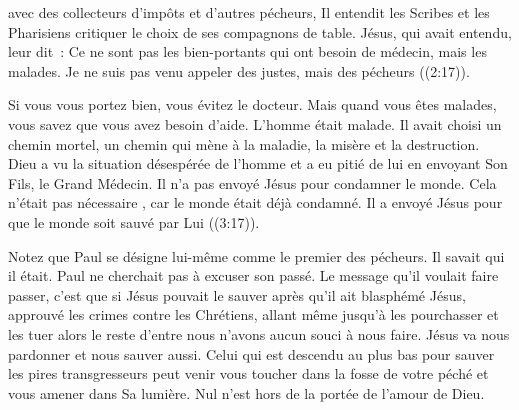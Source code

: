 



 avec des collecteurs d'impôts
 et d'autres pécheurs, Il entendit les Scribes et les Pharisiens
 critiquer le choix de ses compagnons de table.
 \og Jésus, qui avait entendu, leur dit~:
 Ce ne sont pas les bien-portants qui ont besoin de médecin,
 mais les malades. Je ne suis pas venu appeler des justes,
 mais des pécheurs \fg{} 
 ((2:17)).


Si vous vous portez bien, vous évitez le docteur.
 Mais quand vous êtes malades, vous savez que vous avez besoin d'aide.
 L'homme était malade. Il avait choisi un chemin mortel,
 un chemin qui mène à la maladie, la misère et la destruction.
 Dieu a vu la situation désespérée de l'homme et a eu pitié de lui
 en envoyant Son Fils, le Grand Médecin.
 Il n'a pas envoyé Jésus pour condamner le monde.
 Cela n'était pas nécessaire ,
 car le monde était déjà condamné. Il a envoyé Jésus
 \og pour que le monde soit sauvé par Lui \fg{} 
 ((3:17)).

Notez que Paul se désigne lui-même comme le premier des pécheurs.
 Il savait qui il était. Paul ne cherchait pas à excuser son passé.
 Le message qu'il voulait faire passer, c'est que si Jésus pouvait le sauver
 \ocadr après qu'il ait blasphémé Jésus, approuvé les crimes
 contre les Chrétiens, allant même jusqu'à les pourchasser
 et les tuer \fcadr{} alors le reste d'entre nous n'avons aucun souci
 à nous faire. Jésus va nous pardonner et nous sauver aussi.
 Celui qui est descendu au plus bas pour sauver les pires transgresseurs
 peut venir vous toucher dans la fosse de votre péché
 et vous amener dans Sa lumière.
 Nul n'est hors de la portée de l'amour de Dieu.

\dvrule



